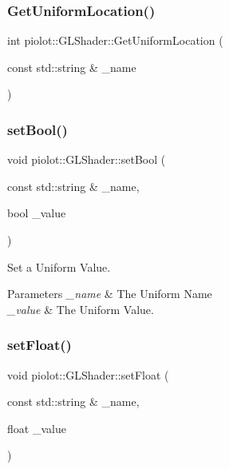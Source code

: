 \subsubsection{\texorpdfstring{Get\+Uniform\+Location()}{GetUniformLocation()}}
{\footnotesize\ttfamily int piolot\+::\+G\+L\+Shader\+::\+Get\+Uniform\+Location (\begin{DoxyParamCaption}\item[{const std\+::string \&}]{\+\_\+name }\end{DoxyParamCaption})\hspace{0.3cm}{\ttfamily [inline]}}

\mbox{\label{classpiolot_1_1_g_l_shader_a8f3349b73adbb3f7d85b847ffc39d0f3}} 
\subsubsection{\texorpdfstring{set\+Bool()}{setBool()}}
{\footnotesize\ttfamily void piolot\+::\+G\+L\+Shader\+::set\+Bool (\begin{DoxyParamCaption}\item[{const std\+::string \&}]{\+\_\+name,  }\item[{bool}]{\+\_\+value }\end{DoxyParamCaption})\hspace{0.3cm}{\ttfamily [inline]}}



Set a Uniform Value. 


\begin{DoxyParams}{Parameters}
{\em \+\_\+name} & The Uniform Name \\
\hline
{\em \+\_\+value} & The Uniform Value. \\
\hline
\end{DoxyParams}
\mbox{\label{classpiolot_1_1_g_l_shader_af6323e1d0956064de4c43ef4fa41b0f1}} 
\subsubsection{\texorpdfstring{set\+Float()}{setFloat()}}
{\footnotesize\ttfamily void piolot\+::\+G\+L\+Shader\+::set\+Float (\begin{DoxyParamCaption}\item[{const std\+::string \&}]{\+\_\+name,  }\item[{float}]{\+\_\+value }\end{DoxyParamCaption})\hspace{0.3cm}{\ttfamily [inline]}}



